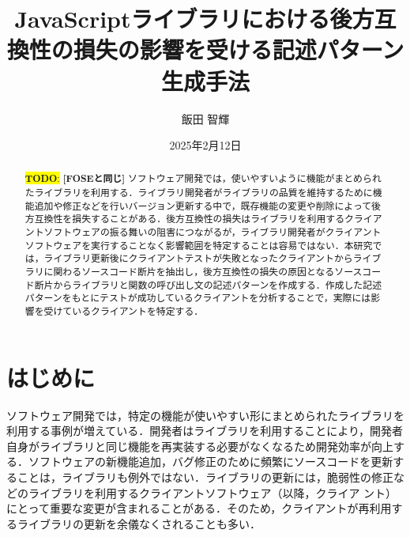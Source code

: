 \documentclass[11pt]{jreport}
\title{JavaScriptライブラリにおける後方互換性の損失の影響を受ける記述パターン生成手法}
\author{飯田 智輝}
\date{2025年2月12日}	%
\newcommand{\todo}[1]{\colorbox{yellow}{{\bf TODO}:}{\color{red} {\textbf{[#1]}}}}
\begin{document}
\maketitle

\begin{abstract}
\todo{FOSEと同じ}
ソフトウェア開発では，使いやすいように機能がまとめられたライブラリを利用する．ライブラリ開発者がライブラリの品質を維持するために機能追加や修正などを行いバージョン更新する中で，既存機能の変更や削除によって後方互換性を損失することがある．後方互換性の損失はライブラリを利用するクライアントソフトウェアの振る舞いの阻害につながるが，ライブラリ開発者がクライアントソフトウェアを実行することなく影響範囲を特定することは容易ではない．本研究では，ライブラリ更新後にクライアントテストが失敗となったクライアントからライブラリに関わるソースコード断片を抽出し，後方互換性の損失の原因となるソースコード断片からライブラリと関数の呼び出し文の記述パターンを作成する．作成した記述パターンをもとにテストが成功しているクライアントを分析することで，実際には影響を受けているクライアントを特定する．
\end{abstract}

\tableofcontents



\newpage
{}	%



\chapter{はじめに}
ソフトウェア開発では，特定の機能が使いやすい形にまとめられたライブラリを利用する事例が増えている\cite{UnderstandingWild}．開発者はライブラリを利用することにより，開発者自身がライブラリと同じ機能を再実装する必要がなくなるため開発効率が向上する\cite{konstantopoulos2009best}\cite{Moser1996effect}．ソフトウェアの新機能追加，バグ修正のために頻繁にソースコードを更新することは，ライブラリも例外ではない\cite{raemaekers2012measuring}．ライブラリの更新には，脆弱性の修正などのライブラリを利用するクライアントソフトウェア（以降，クライア
ント）にとって重要な変更が含まれることがある．そのため，クライアントが再利用するライブラリの更新を余儀なくされることも多い．
\end{document}
